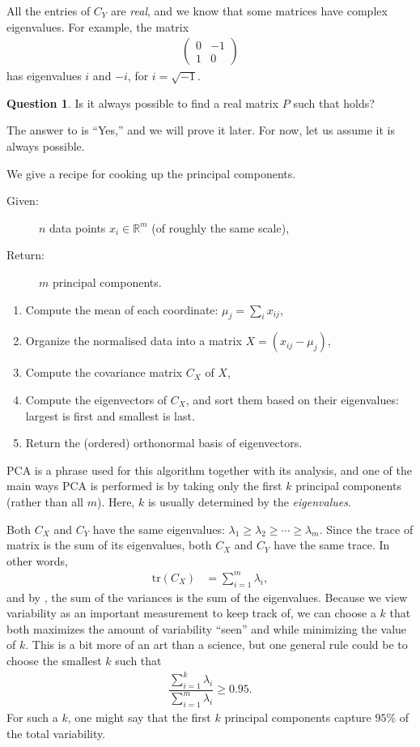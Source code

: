 \documentclass[a4paper, 12pt]{article}
\numberwithin{equation}{section}
\numberwithin{figure}{section}
\theoremstyle{definition}
\newtheorem{quest}[thm]{Question}
\renewcommand{\geq}{\geqslant}
\newcommand{\R}{\mathbb{R}}
\begin{document}
All the entries of $C_Y$ are \textit{real}, and we know that some matrices have
complex eigenvalues. For example, the matrix 
\begin{align*}
	\begin{pmatrix}
		0 & -1 \\ 1 & 0 
	\end{pmatrix}
\end{align*}
has eigenvalues $i$ and $-i$, for $i=\sqrt{-1}$. 
\begin{quest}\label{quest:PCA-possible}
	Is it always possible to find a real matrix $P$ such that 
	holds?
\end{quest}
The answer to  is ``Yes,'' and we will prove it later.
For now, let us assume it is always possible. 

\medskip

We give a recipe for cooking up the principal components.
\begin{description}
	\item[Given:] $n$ data points $x_i\in\R^m$ (of roughly the same scale),
	\item[Return:] $m$ principal components.
\end{description}
\begin{enumerate}
	\item Compute the mean of each coordinate: $\mu_j = \sum_i x_{ij}$,
	\item Organize the normalised data into a matrix $X = (x_{ij} - \mu_j)$,
	\item Compute the covariance matrix $C_X$ of $X$,
	\item Compute the eigenvectors of $C_X$, and sort them based on their
	eigenvalues: largest is first and smallest is last.
	\item Return the (ordered) orthonormal basis of eigenvectors. 
\end{enumerate}

PCA is a phrase used for this algorithm together with its analysis, and one of
the main ways PCA is performed is by taking only the first $k$ principal
components (rather than all $m$). Here, $k$ is usually determined by the
\textit{eigenvalues}. 

Both $C_X$ and $C_Y$ have the same eigenvalues: $\lambda_1 \geq \lambda_2 \geq
\cdots \geq \lambda_m$. Since the trace of matrix is the sum of its eigenvalues,
both $C_X$ and $C_Y$ have the same trace. In other words, 
\begin{align*}
	\mathrm{tr}(C_X) &= \sum_{i=1}^m \lambda_i,
\end{align*}
and by , the sum of the variances is the sum of
the eigenvalues. Because we view variability as an important measurement to keep
track of, we can choose a $k$ that both maximizes the amount of variability
``seen'' and while minimizing the value of $k$. This is a bit more of an art
than a science, but one general rule could be to choose the smallest $k$ such
that 
\begin{align} \label{eqn:k-rule}
	\dfrac{\sum_{i=1}^k\lambda_i}{\sum_{i=1}^m\lambda_i} \geq 0.95.
\end{align} 
For such a $k$, one might say that the first $k$ principal components capture
$95\%$ of the total variability.
\end{document}
